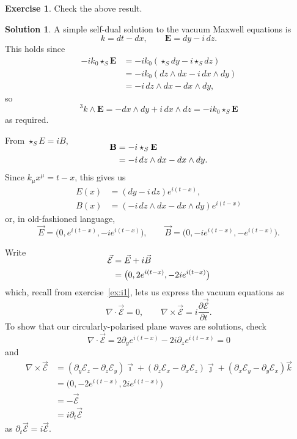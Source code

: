 \documentclass[11pt, a4paper]{report}
\theoremstyle{definition}
\newtheorem{ex}{Exercise}[part]
\newtheorem{sol}{Solution}[part]
\begin{document}
\begin{ex}

Check the above result.

\end{ex}

\begin{sol}

A simple self-dual solution to the vacuum Maxwell equations is
\[
    k = dt - dx, \qquad \mathbf{E} = dy - i \, dz.
\]
This holds since
\begin{align*}
    -i k_0 \star_S \mathbf{E} &= -i k_0 (\star_S dy - i \star_S dz) \\
    &= -i k_0 (dz \wedge dx - i\, dx \wedge dy) \\
    &= -i \, dz \wedge dx - dx \wedge dy,
\end{align*}
so
\[
    ^3 k \wedge \mathbf{E} = -dx \wedge dy + i \, dx \wedge dz = -ik_0 \star_S \mathbf{E}
\]
as required.

From $\star_S E = iB$,
\begin{align*}
    \SwapAboveDisplaySkip
    \mathbf{B} &= -i \star_S \mathbf{E} \\
               &= -i \, dz \wedge dx - dx \wedge dy.
\end{align*}
Since $k_\mu x^\mu = t - x$, this gives us
\begin{align*}
    E(x) &= (dy - i\, dz) e^{i (t - x)}, \\
    B(x) &= (-i \, dz \wedge dx - dx \wedge dy) e^{i (t - x)}
\end{align*}
or, in old-fashioned language,
\[
    \vec{E} = \bigl( 0, e^{i(t - x)}, -ie^{i(t - x)} \bigr), \qquad
    \vec{B} = \bigl( 0, -i e^{i(t - x)}, -e^{i(t - x)} \bigr).
\]

Write
\begin{align*}
    \SwapAboveDisplaySkip
    \vec{\mathcal{E}} &= \vec{E} + i \vec{B} \\
                      &= \bigl( 0, 2 e^{i(t - x)}, -2 i e^{i(t - x)} \bigr)
\end{align*}
which, recall from exercise~\ref{ex:i1}, lets us express the vacuum equations as
\[
    \nabla \cdot \vec{\mathcal{E}} = 0, \qquad
    \nabla \times \vec{\mathcal{E}} = i \frac{\partial \vec{\mathcal{E}}}{\partial t}.
\]
To show that our circularly-polarised plane waves are solutions, check
\[
    \nabla \cdot \vec{\mathcal{E}} = 2 \partial_y e^{i(t - x)}
                                      -2 i \partial_z e^{i(t - x)}
                                   = 0
\]
and
\begin{align*}
    \nabla \times \vec{\mathcal{E}} &= (\partial_y \mathcal{E}_z - \partial_z \mathcal{E}_y) \vec{\imath}
            + (\partial_z \mathcal{E}_x - \partial_x \mathcal{E}_z) \vec{\jmath}
            + (\partial_x \mathcal{E}_y - \partial_y \mathcal{E}_x) \vec{k} \\
        &= \bigl( 0, -2 e^{i(t - x)}, 2 i e^{i(t - x)} \bigr) \\
        &= - \vec{\mathcal{E}} \\
        &= i \partial_t \vec{\mathcal{E}}
\end{align*}
as $\partial_t \vec{\mathcal{E}} = i \vec{\mathcal{E}}$.

\end{sol}
\end{document}
